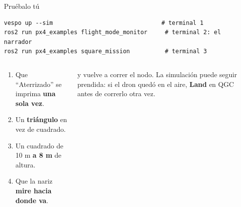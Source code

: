 \begin{frame}[fragile]{Pruébalo tú}
  \begin{lstlisting}[style=bash]
vespo up --sim                               # terminal 1
ros2 run px4_examples flight_mode_monitor     # terminal 2: el narrador
ros2 run px4_examples square_mission          # terminal 3
  \end{lstlisting}
  \begin{columns}[t]
    \begin{idea}[title={\small\bfseries Ejercicios},coltitle=black,colbacktitle=azulclaro]
      \small
      \begin{enumerate}
        \item Que ``Aterrizado'' se imprima \textbf{una sola vez}.
        \item Un \textbf{triángulo} en vez de cuadrado.
        \item Un cuadrado de 10 m \textbf{a 8 m} de altura.
        \item Que la nariz \textbf{mire hacia donde va}.
      \end{enumerate}
    \end{idea}
    \begin{ojo}[title={\small\bfseries Después de cada cambio}]
      \small {} y vuelve a correr el nodo. La simulación puede seguir prendida:
      si el dron quedó en el aire, \textbf{Land} en QGC antes de correrlo otra vez.
    \end{ojo}
  \end{columns}
\end{frame}

